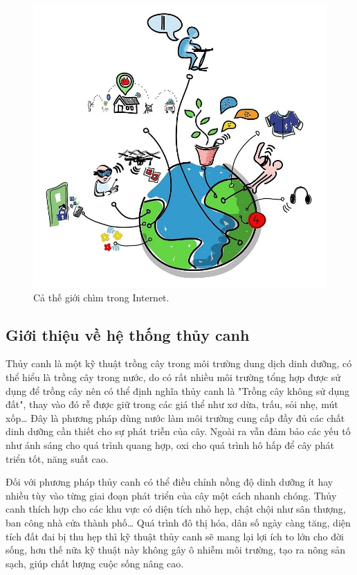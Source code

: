 \documentclass[a4paper,12pt,oneside]{article}
\begin{document}
\begin{figure}[H]
	\centering
	\includegraphics[scale=.4]{hinh/IoT_ungdung.jpg}
	\caption{Cả thế giới chìm trong Internet\cite{iot}.}
	\label{fig:IoT_ungdung}
\end{figure}

\subsection{Giới thiệu về hệ thống thủy canh\cite{thuycanh}}

\noindent Thủy canh là một kỹ thuật trồng cây trong môi trường dung dịch dinh dưỡng, có thể hiểu là trồng cây trong nước, do có rất nhiều môi trường tổng hợp được sử dụng để trồng cây nên có thể định nghĩa thủy canh là "Trồng cây không sử dụng đất"\cite{thuycanh}, thay vào đó rễ được giữ trong các giá thể như xơ dừa, trấu, sỏi nhẹ, mút xốp… Đây là phương pháp dùng nước làm môi trường cung cấp đầy đủ các chất dinh dưỡng cần thiết cho sự phát triễn của cây. Ngoài ra vẫn đảm bảo các yếu tố như ánh sáng cho quá trình quang hợp, oxi cho quá trình hô hấp để cây phát triển tốt, năng suất cao. 

\noindent Đối với phương pháp thủy canh có thể điều chỉnh nồng độ dinh dưỡng ít hay nhiều tùy vào từng giai đoạn phát triển của cây một cách nhanh chóng. Thủy canh thích hợp cho các khu vực có diện tích nhỏ hẹp, chật chội như sân thượng, ban công nhà cửa thành phố… Quá trình đô thị hóa, dân số ngày càng tăng, diện tích đất đai bị thu hẹp thì kỹ thuật thủy canh sẽ mang lại lợi ích to lớn cho đời sống, hơn thế nữa kỹ thuật này không gây ô nhiễm môi trường, tạo ra nông sản sạch, giúp chất lượng cuộc sống nâng cao.
\end{document}
